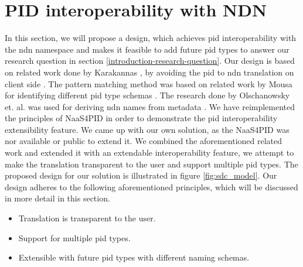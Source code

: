 \section{PID interoperability with NDN}
\label{pid-poc}


In this section, we will propose a design, which achieves \gls{pid} interoperability with the \gls{ndn} namespace and makes it feasible to add future \gls{pid} types to answer our research question in section \ref{introduction-research-question}. Our design is based on related work done by Karakannas \cite{icn-bd}, by avoiding the \gls{pid} to \gls{ndn} translation on client side \cite{icn-bd}. The pattern matching method was based on related work by Mousa for identifying different \gls{pid} type schemas \cite{ndn-app-aware}. The research done by Olschanowsky et. al. was used for deriving \gls{ndn} names from metadata \cite{ndn-man}.
We have reimplemented the principles of NaaS4PID in order to demonstrate the \gls{pid} interoperability extensibility feature. We came up with our own solution, as the NaaS4PID was nor available or public to extend it.
We combined the aforementioned related work and extended it with an extendable interoperability feature, we attempt to make the translation transparent to the user and support multiple \gls{pid} types. The proposed design for our solution is illustrated in figure \ref{fig:sdc_model}.
Our design adheres to the following aforementioned principles, which will be discussed in more detail in this section.
 
\begin{itemize}
    \item{Translation is transparent to the user.}
    \item{Support for multiple \gls{pid} types.}
    \item{Extensible with future \gls{pid} types with different naming schemas.}
\end{itemize}

